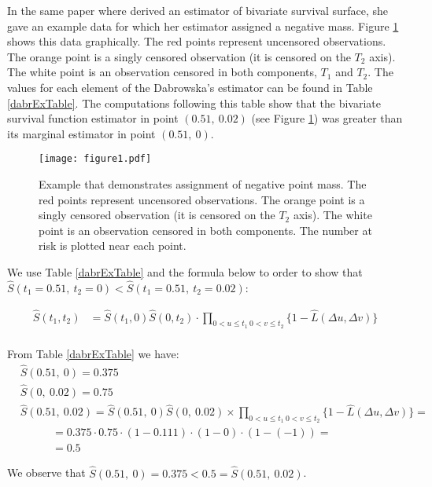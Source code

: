 \documentclass[]{article}
\begin{document}
In the same paper where \cite{dabrowska1988kaplan} derived an estimator of bivariate survival surface, she gave an example data for which her estimator assigned a negative mass. Figure \ref{fig:bubbles} shows this data graphically. The red points represent uncensored observations. The orange point is a singly censored observation (it is censored on the $T_2$ axis). The white point is an observation censored in both components, $T_1$ and $T_2$. The values for each element of the Dabrowska's estimator can be found in Table \ref{dabrExTable}. The computations following this table show that the bivariate survival function estimator in point $(0.51,~0.02)$ (see Figure \ref{fig:bubbles}) was greater than its marginal estimator in point $(0.51,~0)$. 

\begin{figure}[!h]
\caption{Example that demonstrates assignment of negative point mass. The red points represent uncensored observations. The orange point is a singly censored observation (it is censored on the $T_2$ axis). The white point is an observation censored in both components. The number at risk is plotted near each point.}
\texttt{[image: figure1.pdf]}
\label{fig:bubbles}
\end{figure}

We use Table \ref{dabrExTable} and the formula below to order to show that $\hat{S}(t_1=0.51,~t_2=0) < \hat{S}(t_1=0.51,~t_2=0.02)$:

	$$
	\begin{aligned}
		\hat{S}(t_1,t_2) &= \hat{S}(t_1,0)\hat{S}(0,t_2)\cdot \prod_{{0<u\leq t_1~0<v\leq t_2}}\{1 - \hat{L}(\Delta u, \Delta v)\}\\
	\end{aligned}
	$$


From Table \ref{dabrExTable} we have:
	$$
	\begin{aligned}
		&\hat{S}(0.51,~0)  = 0.375\\
		&\hat{S}(0,~0.02)  = 0.75\\
		&\hat{S}(0.51,~0.02) = \hat{S}(0.51,~0)\hat{S}(0,~0.02) \times 
		\prod_{{0<u\leq t_1~0<v\leq t_2}}\{1 - \hat{L}(\Delta u, \Delta v)\}=\\
		&~~~~~~~~~~~~~= 0.375 \cdot 0.75 \cdot (1-0.111)\cdot (1-0)\cdot (1-(-1)) = \\
		&~~~~~~~~~~~~~= 0.5
	\end{aligned}
	$$

We observe that $\hat{S}(0.51,~0) = 0.375 < 0.5 = \hat{S}(0.51,~0.02)$.
\end{document}
